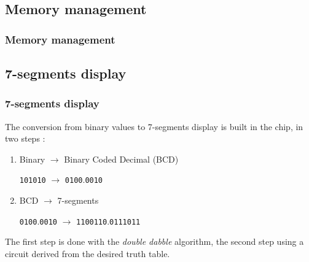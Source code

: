 \documentclass{beamer}
\begin{document}
\subsection{Memory management}

\begin{frame}
	\frametitle{Memory management}
	\centering
	
\end{frame}

\subsection{7-segments display}

\begin{frame}
\frametitle{7-segments display}
The conversion from binary values to 7-segments display is built in the chip, in two steps :
\begin{enumerate}
    \item Binary $\rightarrow$ Binary Coded Decimal (BCD)
        
          \texttt{101010} $\rightarrow$ \texttt{0100}.\texttt{0010}
    \item BCD $\rightarrow$ 7-segments

        \texttt{0100}.\texttt{0010} $\rightarrow$ \texttt{1100110}.\texttt{0111011}
\end{enumerate}

The first step is done with the \emph{double dabble} algorithm, the second step using a circuit derived
from the desired truth table.

\end{frame}
\end{document}
